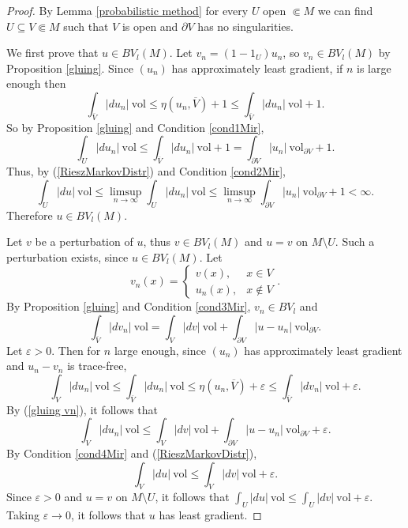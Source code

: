\documentclass[reqno,12pt,letterpaper]{amsart}
\newcommand{\vol}{\mathrm{vol}}
\theoremstyle{definition}
\numberwithin{equation}{section}
\begin{document}
\begin{proof}
By Lemma \ref{probabilistic method} for every $U$ open $\Subset M$ we can find $U \subseteq V \Subset M$ such that $V$ is open and $\partial V$ has no singularities.

We first prove that $u \in BV_l(M)$.
Let $v_n = (1 - 1_U)u_n$, so $v_n \in BV_l(M)$ by Proposition \ref{gluing}.
Since $(u_n)$ has approximately least gradient, if $n$ is large enough then
$$\int_{\overline V} |du_n| ~\vol \leq \eta(u_n, \overline V) + 1 \leq \int_{\overline V} |du_n| ~\vol + 1.$$
So by Proposition \ref{gluing} and Condition \ref{cond1Mir},
$$\int_U |du_n| ~\vol \leq \int_{\overline V} |du_n| ~\vol + 1 = \int_{\partial V} |u_n| ~\vol_{\partial V} + 1.$$
Thus, by (\ref{RieszMarkovDistr}) and Condition \ref{cond2Mir},
$$\int_U |du| ~\vol \leq \limsup_{n \to \infty} \int_U |du_n| ~\vol \leq \limsup_{n \to \infty} \int_{\partial V} |u_n| ~\vol_{\partial V} + 1 < \infty.$$
Therefore $u \in BV_l(M)$.

Let $v$ be a perturbation of $u$, thus $v \in BV_l(M)$ and $u = v$ on $M \setminus U$.
Such a perturbation exists, since $u \in BV_l(M)$.
Let
$$v_n(x) = \begin{cases}
v(x), &x \in V\\
u_n(x), &x \notin V
\end{cases}.$$
By Proposition \ref{gluing} and Condition \ref{cond3Mir}, $v_n \in BV_l$ and
\begin{equation}\label{gluing vn}
\int_{\overline V} |dv_n| ~\vol = \int_V |dv| ~\vol + \int_{\partial V} |u - u_n| ~\vol_{\partial V}.
\end{equation}
Let $\varepsilon > 0$. Then for $n$ large enough, since $(u_n)$ has approximately least gradient and $u_n - v_n$ is trace-free,
$$\int_V |du_n| ~\vol \leq \int_{\overline V} |du_n| ~\vol \leq \eta(u_n, \overline V) + \varepsilon \leq \int_{\overline V} |dv_n| ~\vol + \varepsilon.$$
By (\ref{gluing vn}), it follows that
$$\int_V |du_n| ~\vol \leq \int_V |dv| ~\vol + \int_{\partial V} |u - u_n| ~\vol_{\partial V} + \varepsilon.$$
By Condition \ref{cond4Mir} and (\ref{RieszMarkovDistr}),
$$\int_V |du| ~\vol \leq \int_V |dv| ~\vol + \varepsilon.$$
Since $\varepsilon > 0$ and $u = v$ on $M \setminus U$, it follows that $\int_U |du| ~\vol \leq \int_U |dv| ~\vol + \varepsilon$.
Taking $\varepsilon \to 0$, it follows that $u$ has least gradient.


\end{proof}
\end{document}

